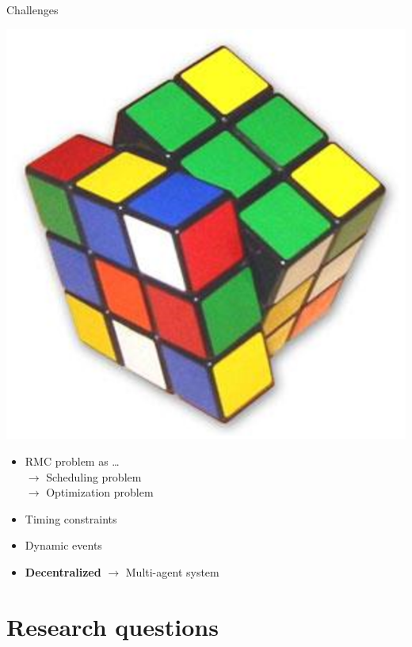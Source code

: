 \documentclass[dvipsnames,handout]{beamer}
\begin{document}
\begin{frame}{Challenges}
\begin{center}
\includegraphics[scale=0.5]{figs/rubiks-cube.eps}
\end{center}
\vspace{-2.0em}
\begin{itemize}
  \item RMC problem as \ldots \\
  \hspace{0.25in} $\rightarrow$ Scheduling problem \\
  \hspace{0.25in} $\rightarrow$ Optimization problem
	\item Timing constraints
	\item Dynamic events
	\item \textbf{Decentralized} $\rightarrow$ Multi-agent system
\end{itemize}

\end{frame}

\section{Research questions}
\end{document}
